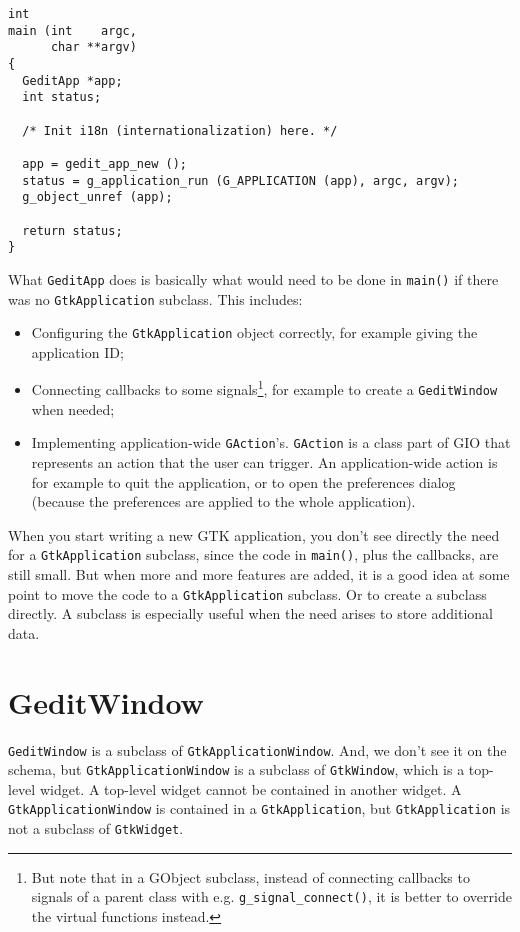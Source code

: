 \begin{lstlisting}
int
main (int    argc,
      char **argv)
{
  GeditApp *app;
  int status;

  /* Init i18n (internationalization) here. */

  app = gedit_app_new ();
  status = g_application_run (G_APPLICATION (app), argc, argv);
  g_object_unref (app);

  return status;
}
\end{lstlisting}

What \lstinline{GeditApp} does is basically what would need to be done in \lstinline{main()} if there was no \lstinline{GtkApplication} subclass. This includes:
\begin{itemize}
  \item Configuring the \lstinline{GtkApplication} object correctly, for example giving the application ID;
  \item Connecting callbacks to some signals\footnote{But note that in a GObject subclass, instead of connecting callbacks to signals of a parent class with e.g. \lstinline{g_signal_connect()}, it is better to override the virtual functions instead.}, for example to create a \lstinline{GeditWindow} when needed;
  \item Implementing application-wide \lstinline{GAction}'s. \lstinline{GAction} is a class part of GIO that represents an action that the user can trigger. An application-wide action is for example to quit the application, or to open the preferences dialog (because the preferences are applied to the whole application).
\end{itemize}

When you start writing a new GTK application, you don't see directly the need for a \lstinline{GtkApplication} subclass, since the code in \lstinline{main()}, plus the callbacks, are still small. But when more and more features are added, it is a good idea at some point to move the code to a \lstinline{GtkApplication} subclass. Or to create a subclass directly. A subclass is especially useful when the need arises to store additional data.

\section{GeditWindow}

\lstinline{GeditWindow} is a subclass of \lstinline{GtkApplicationWindow}. And, we don't see it on the schema, but \lstinline{GtkApplicationWindow} is a subclass of \lstinline{GtkWindow}, which is a top-level widget. A top-level widget cannot be contained in another widget. A \lstinline{GtkApplicationWindow} is contained in a \lstinline{GtkApplication}, but \lstinline{GtkApplication} is not a subclass of \lstinline{GtkWidget}.

